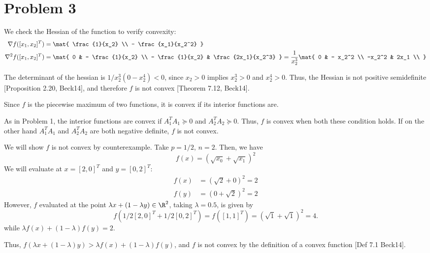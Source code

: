 \documentclass{homework}
\begin{document}
\section{Problem 3}
\begin{letterenum}
    \item We check the Hessian of the function to verify convexity:
    \begin{align*}
        \nabla f([x_1, x_2]^T) &= \mat{
            \frac{1}{x_2} \\
            - \frac{x_1}{x_2^2}
        } \\
        \nabla^2 f([x_1, x_2]^T) &= \mat{
            0 & - \frac{1}{x_2} \\
            - \frac{1}{x_2} & \frac{2x_1}{x_2^3}
        } = \frac{1}{x_2^3} \mat{
            0 & - x_2^2 \\
            -x_2^2 & 2x_1 \\
        }
    \end{align*}

    The determinant of the hessian is $1/x_2^3 (0 - x_2^4) < 0$, since
    $x_2 > 0$ implies $x_2^3 > 0$ and $x_2^4 > 0$. Thus, the
    Hessian is not positive semidefinite [Proposition 2.20, Beck14],
    and therefore $f$ is not convex [Theorem 7.12, Beck14].

    \item Since $f$ is the piecewise maximum of two functions, it is
        convex if its interior functions are.

        As in Problem 1, the interior functions are convex if
        $A_1^T A_1 \succeq 0$ and $A_2^T A_2 \succeq 0$. Thus, $f$
        is convex when both these condition holds. If on the other
        hand $A_1^T A_1$ and $A_2^T A_2$ are both negative definite, $f$
        is not convex.

    \item We will show $f$ is not convex by counterexample. Take $p = 1/2$,
        $n=2$. Then, we have
        \begin{equation*}
            f(x) = (\sqrt{x_0} + \sqrt{x_1})^2
        \end{equation*}
        We will evaluate at $x = [2, 0]^T$ and $y=[0,2]^T$:
        \begin{align*}
            f(x) &= (\sqrt{2} + 0)^2 = 2 \\
            f(y) &= (0 + \sqrt{2})^2 = 2
        \end{align*}
        However, $f$ evaluated at the point $\lambda x + (1 - \lambda y)\in\R^2$,
        taking $\lambda=0.5$, is given by
        \begin{equation*}
            f(1/2 [2, 0]^T + 1/2 [0, 2]^T) = f([1, 1]^T)
                = (\sqrt{1} + \sqrt{1})^2 = 4.
        \end{equation*}
        while $\lambda f(x) + (1 - \lambda) f(y) = 2$.

        Thus, $f(\lambda x + (1 - \lambda)y) > \lambda f(x) + (1 - \lambda) f(y)$,
        and $f$ is not convex by the definition of a convex function
        [Def 7.1 Beck14].
\end{letterenum}
\end{document}
